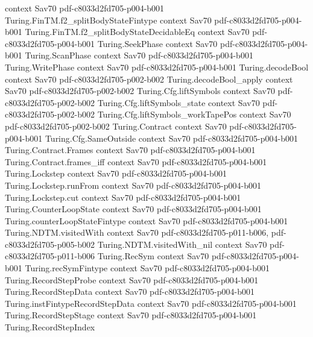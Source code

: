\begin{theorem}
  {context}
  {Sav70}
  {pdf-c8033d2fd705-p004-b001}
\proofstep
  {Turing.FinTM.f2_splitBodyStateFintype}
  {context}
  {Sav70}
  {pdf-c8033d2fd705-p004-b001}
\proofstep
  {Turing.FinTM.f2_splitBodyStateDecidableEq}
  {context}
  {Sav70}
  {pdf-c8033d2fd705-p004-b001}
\proofstep
  {Turing.SeekPhase}
  {context}
  {Sav70}
  {pdf-c8033d2fd705-p004-b001}
\proofstep
  {Turing.ScanPhase}
  {context}
  {Sav70}
  {pdf-c8033d2fd705-p004-b001}
\proofstep
  {Turing.WritePhase}
  {context}
  {Sav70}
  {pdf-c8033d2fd705-p004-b001}
\proofstep
  {Turing.decodeBool}
  {context}
  {Sav70}
  {pdf-c8033d2fd705-p002-b002}
\proofstep
  {Turing.decodeBool_apply}
  {context}
  {Sav70}
  {pdf-c8033d2fd705-p002-b002}
\proofstep
  {Turing.Cfg.liftSymbols}
  {context}
  {Sav70}
  {pdf-c8033d2fd705-p002-b002}
\proofstep
  {Turing.Cfg.liftSymbols_state}
  {context}
  {Sav70}
  {pdf-c8033d2fd705-p002-b002}
\proofstep
  {Turing.Cfg.liftSymbols_workTapePos}
  {context}
  {Sav70}
  {pdf-c8033d2fd705-p002-b002}
\proofstep
  {Turing.Contract}
  {context}
  {Sav70}
  {pdf-c8033d2fd705-p004-b001}
\proofstep
  {Turing.Cfg.SameOutside}
  {context}
  {Sav70}
  {pdf-c8033d2fd705-p004-b001}
\proofstep
  {Turing.Contract.Frames}
  {context}
  {Sav70}
  {pdf-c8033d2fd705-p004-b001}
\proofstep
  {Turing.Contract.frames_iff}
  {context}
  {Sav70}
  {pdf-c8033d2fd705-p004-b001}
\proofstep
  {Turing.Lockstep}
  {context}
  {Sav70}
  {pdf-c8033d2fd705-p004-b001}
\proofstep
  {Turing.Lockstep.runFrom}
  {context}
  {Sav70}
  {pdf-c8033d2fd705-p004-b001}
\proofstep
  {Turing.Lockstep.cut}
  {context}
  {Sav70}
  {pdf-c8033d2fd705-p004-b001}
\proofstep
  {Turing.CounterLoopState}
  {context}
  {Sav70}
  {pdf-c8033d2fd705-p004-b001}
\proofstep
  {Turing.counterLoopStateFintype}
  {context}
  {Sav70}
  {pdf-c8033d2fd705-p004-b001}
\proofstep
  {Turing.NDTM.visitedWith}
  {context}
  {Sav70}
  {pdf-c8033d2fd705-p011-b006,
    pdf-c8033d2fd705-p005-b002}
\proofstep
  {Turing.NDTM.visitedWith_nil}
  {context}
  {Sav70}
  {pdf-c8033d2fd705-p011-b006}
\proofstep
  {Turing.RecSym}
  {context}
  {Sav70}
  {pdf-c8033d2fd705-p004-b001}
\proofstep
  {Turing.recSymFintype}
  {context}
  {Sav70}
  {pdf-c8033d2fd705-p004-b001}
\proofstep
  {Turing.RecordStepProbe}
  {context}
  {Sav70}
  {pdf-c8033d2fd705-p004-b001}
\proofstep
  {Turing.RecordStepData}
  {context}
  {Sav70}
  {pdf-c8033d2fd705-p004-b001}
\proofstep
  {Turing.instFintypeRecordStepData}
  {context}
  {Sav70}
  {pdf-c8033d2fd705-p004-b001}
\proofstep
  {Turing.RecordStepStage}
  {context}
  {Sav70}
  {pdf-c8033d2fd705-p004-b001}
\proofstep
  {Turing.RecordStepIndex}

\end{theorem}
